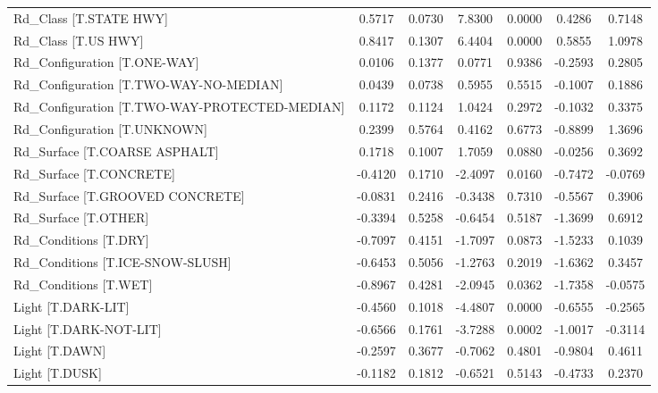 \begin{longtable}{p{4cm}cccccc}
Rd\_Class [T.STATE HWY]                        &  0.5717 &    0.0730 &  7.8300 &       0.0000 &  0.4286 &  0.7148 \\
Rd\_Class [T.US HWY]                           &  0.8417 &    0.1307 &  6.4404 &       0.0000 &  0.5855 &  1.0978 \\
Rd\_Configuration [T.ONE-WAY]                  &  0.0106 &    0.1377 &  0.0771 &       0.9386 & -0.2593 &  0.2805 \\
Rd\_Configuration [T.TWO-WAY-NO-MEDIAN]        &  0.0439 &    0.0738 &  0.5955 &       0.5515 & -0.1007 &  0.1886 \\
Rd\_Configuration [T.TWO-WAY-PROTECTED-MEDIAN] &  0.1172 &    0.1124 &  1.0424 &       0.2972 & -0.1032 &  0.3375 \\
Rd\_Configuration [T.UNKNOWN]                  &  0.2399 &    0.5764 &  0.4162 &       0.6773 & -0.8899 &  1.3696 \\
Rd\_Surface [T.COARSE ASPHALT]                 &  0.1718 &    0.1007 &  1.7059 &       0.0880 & -0.0256 &  0.3692 \\
Rd\_Surface [T.CONCRETE]                       & -0.4120 &    0.1710 & -2.4097 &       0.0160 & -0.7472 & -0.0769 \\
Rd\_Surface [T.GROOVED CONCRETE]               & -0.0831 &    0.2416 & -0.3438 &       0.7310 & -0.5567 &  0.3906 \\
Rd\_Surface [T.OTHER]                          & -0.3394 &    0.5258 & -0.6454 &       0.5187 & -1.3699 &  0.6912 \\
Rd\_Conditions [T.DRY]                         & -0.7097 &    0.4151 & -1.7097 &       0.0873 & -1.5233 &  0.1039 \\
Rd\_Conditions [T.ICE-SNOW-SLUSH]              & -0.6453 &    0.5056 & -1.2763 &       0.2019 & -1.6362 &  0.3457 \\
Rd\_Conditions [T.WET]                         & -0.8967 &    0.4281 & -2.0945 &       0.0362 & -1.7358 & -0.0575 \\
Light [T.DARK-LIT]                            & -0.4560 &    0.1018 & -4.4807 &       0.0000 & -0.6555 & -0.2565 \\
Light [T.DARK-NOT-LIT]                        & -0.6566 &    0.1761 & -3.7288 &       0.0002 & -1.0017 & -0.3114 \\
Light [T.DAWN]                                & -0.2597 &    0.3677 & -0.7062 &       0.4801 & -0.9804 &  0.4611 \\
Light [T.DUSK]                                & -0.1182 &    0.1812 & -0.6521 &       0.5143 & -0.4733 &  0.2370 \\

\end{longtable}
